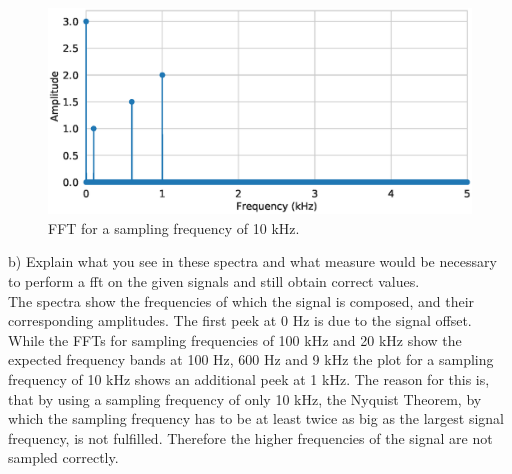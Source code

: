 \documentclass{scrartcl}			%
\begin{document}
\begin{figure}[h!]					%
	\centering
	\includegraphics[width=\textwidth]{imgs/10kHz_samplefreq.eps}
	\captionsetup{width=\textwidth}  %
	\caption{FFT for a sampling frequency of 10 kHz.}
	\label{fig:10kHz} %
\end{figure}
b) Explain what you see in these spectra and what measure would be necessary to perform a fft on the given signals and still obtain correct values.\\
\newline
The spectra show the frequencies of which the signal is composed, and their corresponding amplitudes. The first peek at 0 Hz is due to the signal offset. While the FFTs for sampling frequencies of 100 kHz and 20 kHz show the expected frequency bands at 100 Hz, 600 Hz and 9 kHz the plot for a sampling frequency of 10 kHz shows an additional peek at 1 kHz. The reason for this is, that by using a sampling frequency of only 10 kHz, the Nyquist Theorem, by which the sampling frequency has to be at least twice as big as the largest signal frequency, is not fulfilled. Therefore the higher frequencies of the signal are not sampled correctly. 
\end{document}
